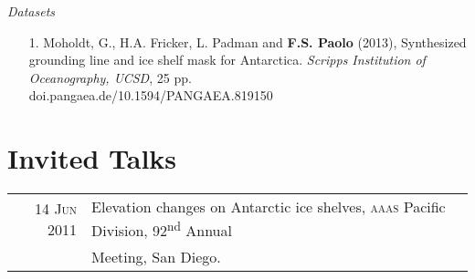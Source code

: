\documentclass[a4paper,11pt]{article}
\begin{document}
\emph{Datasets}

\begin{enumerate}
  \item [1.] Moholdt, G., H.A. Fricker, L. Padman and {\bf F.S. Paolo} (2013), 
        Synthesized grounding line and ice shelf mask for Antarctica.
        {\it Scripps Institution of Oceanography, UCSD}, 25 pp.\\
        doi.pangaea.de/10.1594/PANGAEA.819150
\end{enumerate}


\section{Invited Talks}

\begin{tabular}{rl}
14 \textsc{Jun} 2011 & Elevation changes on Antarctic ice shelves, \textsc{aaas} Pacific Division, 92\textsuperscript{nd} Annual\\ 
& Meeting, San Diego.
\end{tabular}


%


%
\end{document}
